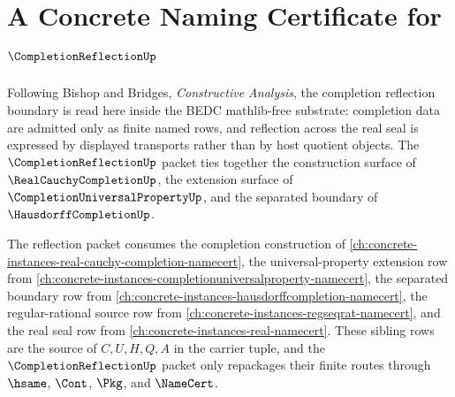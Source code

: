 \chapter{A Concrete Naming Certificate for $\CompletionReflectionUp$}
\label{ch:concrete-instances-completionreflection-namecert}

Following Bishop and Bridges, \emph{Constructive Analysis}, the completion reflection boundary is read here inside the BEDC mathlib-free substrate: completion data are admitted only as finite named rows, and reflection across the real seal is expressed by displayed transports rather than by host quotient objects. The $\CompletionReflectionUp$ packet ties together the construction surface of $\RealCauchyCompletionUp$, the extension surface of $\CompletionUniversalPropertyUp$, and the separated boundary of $\HausdorffCompletionUp$.

The reflection packet consumes the completion construction of \autoref{ch:concrete-instances-real-cauchy-completion-namecert}, the universal-property extension row from \autoref{ch:concrete-instances-completionuniversalproperty-namecert}, the separated boundary row from \autoref{ch:concrete-instances-hausdorffcompletion-namecert}, the regular-rational source row from \autoref{ch:concrete-instances-regseqrat-namecert}, and the real seal row from \autoref{ch:concrete-instances-real-namecert}. These sibling rows are the source of $C,U,H,Q,A$ in the carrier tuple, and the $\CompletionReflectionUp$ packet only repackages their finite routes through $\hsame$, $\Cont$, $\Pkg$, and $\NameCert$.

